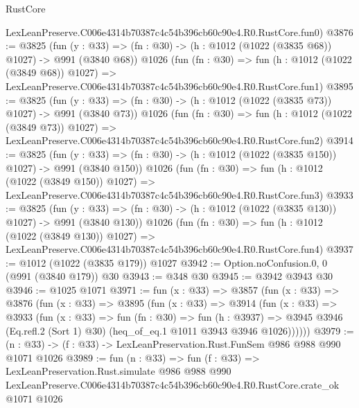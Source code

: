 \begin{lexlean}{RustCore}
\begin{coremodule}
    LexLeanPreserve.C006e4314b70387c4c54b396cb60c90e4.R0.RustCore.fun0)
@3876 := @3825
    (fun (y : @33) => (fn : @30) -> (h : @1012 (@1022 (@3835 @68)) @1027) -> @991 (@3840 @68))
    @1026
    (fun (fn : @30) =>
    fun (h : @1012 (@1022 (@3849 @68)) @1027) =>
    LexLeanPreserve.C006e4314b70387c4c54b396cb60c90e4.R0.RustCore.fun1)
@3895 := @3825
    (fun (y : @33) => (fn : @30) -> (h : @1012 (@1022 (@3835 @73)) @1027) -> @991 (@3840 @73))
    @1026
    (fun (fn : @30) =>
    fun (h : @1012 (@1022 (@3849 @73)) @1027) =>
    LexLeanPreserve.C006e4314b70387c4c54b396cb60c90e4.R0.RustCore.fun2)
@3914 := @3825
    (fun (y : @33) => (fn : @30) -> (h : @1012 (@1022 (@3835 @150)) @1027) -> @991 (@3840 @150))
    @1026
    (fun (fn : @30) =>
    fun (h : @1012 (@1022 (@3849 @150)) @1027) =>
    LexLeanPreserve.C006e4314b70387c4c54b396cb60c90e4.R0.RustCore.fun3)
@3933 := @3825
    (fun (y : @33) => (fn : @30) -> (h : @1012 (@1022 (@3835 @130)) @1027) -> @991 (@3840 @130))
    @1026
    (fun (fn : @30) =>
    fun (h : @1012 (@1022 (@3849 @130)) @1027) =>
    LexLeanPreserve.C006e4314b70387c4c54b396cb60c90e4.R0.RustCore.fun4)
@3937 := @1012 (@1022 (@3835 @179)) @1027
@3942 := Option.noConfusion.{0, 0} (@991 (@3840 @179)) @30
@3943 := @348 @30
@3945 := @3942 @3943 @30
@3946 := @1025 @1071
@3971 := fun (x : @33) =>
  @3857
    (fun (x : @33) =>
    @3876
      (fun (x : @33) =>
      @3895
        (fun (x : @33) =>
        @3914
          (fun (x : @33) =>
          @3933
            (fun (x : @33) =>
            fun (fn : @30) =>
            fun (h : @3937) =>
            @3945 @3946 (Eq.refl.{2} (Sort 1) @30) (heq_of_eq.{1} @1011 @3943 @3946 @1026))))))
@3979 := (n : @33) -> (f : @33) -> LexLeanPreservation.Rust.FunSem @986 @988 @990 @1071 @1026
@3989 := fun (n : @33) =>
  fun (f : @33) =>
  LexLeanPreservation.Rust.simulate
    @986
    @988
    @990
    LexLeanPreserve.C006e4314b70387c4c54b396cb60c90e4.R0.RustCore.crate_ok
    @1071
    @1026
\end{coremodule}
\end{lexlean}
